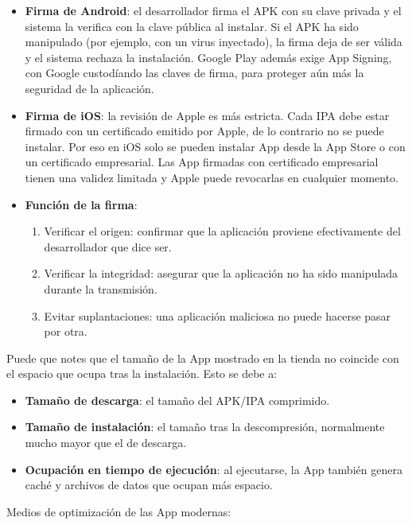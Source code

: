 \begin{itemize}
  \item \textbf{Firma de Android}: el desarrollador firma el APK con su clave privada y el sistema la verifica con la clave pública al instalar. Si el APK ha sido manipulado (por ejemplo, con un virus inyectado), la firma deja de ser válida y el sistema rechaza la instalación. Google Play además exige App Signing, con Google custodíando las claves de firma, para proteger aún más la seguridad de la aplicación.
  \item \textbf{Firma de iOS}: la revisión de Apple es más estricta. Cada IPA debe estar firmado con un certificado emitido por Apple, de lo contrario no se puede instalar. Por eso en iOS solo se pueden instalar App desde la App Store o con un certificado empresarial. Las App firmadas con certificado empresarial tienen una validez limitada y Apple puede revocarlas en cualquier momento.
  \item \textbf{Función de la firma}:
  \begin{enumerate}
    \item Verificar el origen: confirmar que la aplicación proviene efectivamente del desarrollador que dice ser.
    \item Verificar la integridad: asegurar que la aplicación no ha sido manipulada durante la transmisión.
    \item Evitar suplantaciones: una aplicación maliciosa no puede hacerse pasar por otra.
  \end{enumerate}
\end{itemize}


Puede que notes que el tamaño de la App mostrado en la tienda no coincide con el espacio que ocupa tras la instalación. Esto se debe a:

\begin{itemize}
  \item \textbf{Tamaño de descarga}: el tamaño del APK/IPA comprimido.
  \item \textbf{Tamaño de instalación}: el tamaño tras la descompresión, normalmente mucho mayor que el de descarga.
  \item \textbf{Ocupación en tiempo de ejecución}: al ejecutarse, la App también genera caché y archivos de datos que ocupan más espacio.
\end{itemize}

Medios de optimización de las App modernas:

